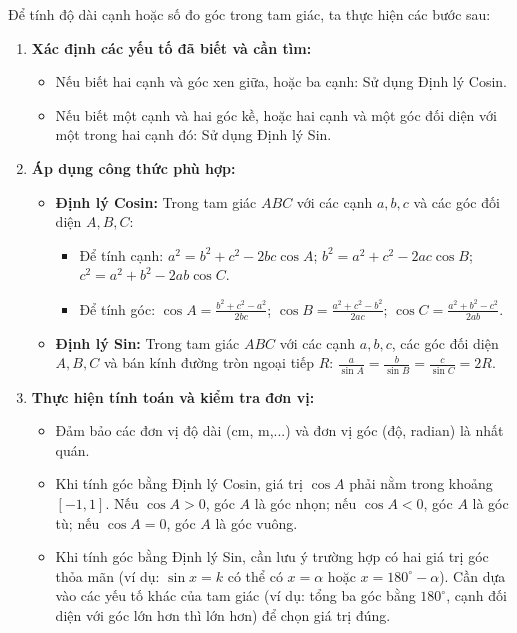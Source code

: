 \begin{phuongphap}
Để tính độ dài cạnh hoặc số đo góc trong tam giác, ta thực hiện các bước sau:
\begin{enumerate}
    \item \textbf{Xác định các yếu tố đã biết và cần tìm:}
    \begin{itemize}
        \item Nếu biết hai cạnh và góc xen giữa, hoặc ba cạnh: Sử dụng Định lý Cosin.
        \item Nếu biết một cạnh và hai góc kề, hoặc hai cạnh và một góc đối diện với một trong hai cạnh đó: Sử dụng Định lý Sin.
    \end{itemize}
    \item \textbf{Áp dụng công thức phù hợp:}
    \begin{itemize}
        \item \textbf{Định lý Cosin:} Trong tam giác $ABC$ với các cạnh $a, b, c$ và các góc đối diện $A, B, C$:
        \begin{itemize}
            \item Để tính cạnh: $a^2 = b^2 + c^2 - 2bc \cos A$; $b^2 = a^2 + c^2 - 2ac \cos B$; $c^2 = a^2 + b^2 - 2ab \cos C$.
            \item Để tính góc: $\cos A = \frac{b^2 + c^2 - a^2}{2bc}$; $\cos B = \frac{a^2 + c^2 - b^2}{2ac}$; $\cos C = \frac{a^2 + b^2 - c^2}{2ab}$.
        \end{itemize}
        \item \textbf{Định lý Sin:} Trong tam giác $ABC$ với các cạnh $a, b, c$, các góc đối diện $A, B, C$ và bán kính đường tròn ngoại tiếp $R$:
        $\frac{a}{\sin A} = \frac{b}{\sin B} = \frac{c}{\sin C} = 2R$.
    \end{itemize}
    \item \textbf{Thực hiện tính toán và kiểm tra đơn vị:}
    \begin{itemize}
        \item Đảm bảo các đơn vị độ dài (cm, m,...) và đơn vị góc (độ, radian) là nhất quán.
        \item Khi tính góc bằng Định lý Cosin, giá trị $\cos A$ phải nằm trong khoảng $[-1, 1]$. Nếu $\cos A > 0$, góc $A$ là góc nhọn; nếu $\cos A < 0$, góc $A$ là góc tù; nếu $\cos A = 0$, góc $A$ là góc vuông.
        \item Khi tính góc bằng Định lý Sin, cần lưu ý trường hợp có hai giá trị góc thỏa mãn (ví dụ: $\sin x = k$ có thể có $x = \alpha$ hoặc $x = 180^\circ - \alpha$). Cần dựa vào các yếu tố khác của tam giác (ví dụ: tổng ba góc bằng $180^\circ$, cạnh đối diện với góc lớn hơn thì lớn hơn) để chọn giá trị đúng.
    \end{itemize}
\end{enumerate}
\end{phuongphap}
